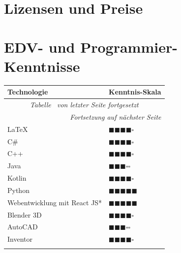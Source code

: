 \documentclass[11pt, a4paper]{moderncv}
\begin{document}
	\section{Lizensen und Preise}
	
	
	\section{EDV- und Programmier-Kenntnisse}
	\begin{longtable}[c]{p{11cm} p{3cm}}
		\label{tab:perf-2}\\
		\textbf{Technologie} & \textbf{Kenntnis-Skala} \\
		\hline
		\endfirsthead
		\multicolumn{2}{c}{{\textit{Tabelle \thetable\ von letzter Seite fortgesetzt} }} \\
		\endhead
		\multicolumn{2}{r}{\textit{Fortsetzung auf nächster Seite}} \\
		\endfoot
		\endlastfoot
		\showrowcolors
		\LaTeX & $ \blacksquare\blacksquare\blacksquare\blacksquare\square $ \\
		C\# & $ \blacksquare\blacksquare\blacksquare\blacksquare\square $ \\
		C++ & $ \blacksquare\blacksquare\blacksquare\blacksquare\square $ \\
		Java & $ \blacksquare\blacksquare\blacksquare\square\square $ \\
		Kotlin & $ \blacksquare\blacksquare\blacksquare\blacksquare\square $ \\
		Python & $ \blacksquare\blacksquare\blacksquare\blacksquare\blacksquare $ \\
		Webentwicklung mit React JS* & $ \blacksquare\blacksquare\blacksquare\blacksquare\blacksquare $ \\
		Blender 3D & $ \blacksquare\blacksquare\blacksquare\blacksquare\square $ \\
		AutoCAD & $ \blacksquare\blacksquare\blacksquare\square\square $ \\
		Inventor & $ \blacksquare\blacksquare\blacksquare\blacksquare\square $ \\
		\hiderowcolors    
	\end{longtable}
\end{document}

